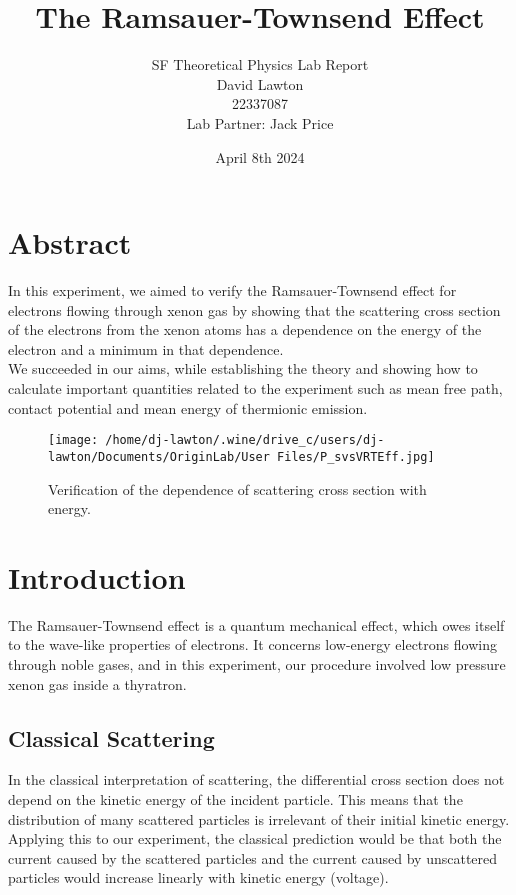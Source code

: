 \documentclass{article}
\title{The Ramsauer-Townsend Effect}
\author{SF Theoretical Physics Lab Report\\David Lawton\\22337087\\Lab Partner: Jack Price}
\date{April 8th 2024}
\begin{document}
\maketitle
\vfill
\tableofcontents

\newpage
\section{Abstract}
In this experiment, we aimed to verify the Ramsauer-Townsend effect for electrons flowing through xenon gas by showing that the scattering cross section of the electrons from the xenon atoms has a dependence on the energy of the electron and a minimum in that dependence.\\
\indent We succeeded in our aims, while establishing the theory and showing how to calculate important quantities related to the experiment such as mean free path, contact potential and mean energy of thermionic emission.
\begin{figure}[H]
\begin{center}
\texttt{[image: /home/dj-lawton/.wine/drive\_c/users/dj-lawton/Documents/OriginLab/User Files/P\_svsVRTEff.jpg]}
\caption{Verification of the dependence of scattering cross section with energy.}
\end{center}
\end{figure}
\section{Introduction}
The Ramsauer-Townsend effect is a quantum mechanical effect, which owes itself to the wave-like properties of electrons. It concerns low-energy electrons flowing through noble gases, and in this experiment, our procedure involved low pressure xenon gas inside a thyratron.
\subsection{Classical Scattering}
In the classical interpretation of scattering, the differential cross section does not depend on the kinetic energy of the incident particle. This means that the distribution of many scattered particles is irrelevant of their initial kinetic energy. Applying this to our experiment, the classical prediction would be that both the current caused by the scattered particles and the current caused by unscattered particles would increase linearly with kinetic energy (voltage).
\end{document}
